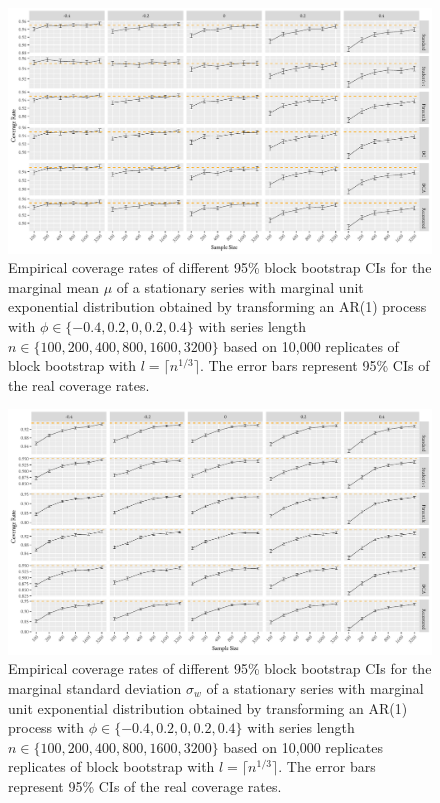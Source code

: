 \documentclass[12pt]{article}
\newcommand{\eds}[1]{\textcolor{blue}{(EDS: #1)}}
\newcommand{\mc}[1]{\textcolor{green}{(MC: #1)}}
\begin{document}
\begin{figure}[tbp]
  \centering
  \includegraphics[width=\textwidth]{figures/plot_exp_mu_1}
  \caption{Empirical coverage rates of different 95\% block bootstrap CIs for
    the marginal mean $\mu$ of a stationary series with marginal unit exponential
    distribution obtained by transforming an AR(1) process with
    $\phi \in \{-0.4, 0.2, 0, 0.2, 0.4\}$ with series length
    $n \in \{100, 200, 400, 800, 1600, 3200\}$ based on 10,000 replicates of
    block bootstrap with $l = \lceil n^{1/3} \rceil$. 
    The error bars represent 95\% CIs of the real coverage rates.}
  \label{fig:exp_mu1}
\end{figure}


\begin{figure}[tbp]
  \centering
  \includegraphics[width=\textwidth]{figures/plot_exp_sigma_1}
  \caption{Empirical coverage rates of different 95\% block bootstrap CIs for
    the marginal standard deviation $\sigma_w$ %
    of a stationary series with 
    marginal unit exponential distribution obtained by transforming an AR(1) process
    with $\phi \in \{-0.4, 0.2, 0, 0.2, 0.4\}$ with series length 
    $n \in \{100, 200, 400, 800, 1600, 3200\}$ based on 10,000 replicates 
    replicates of
    block bootstrap with $l = \lceil n^{1/3} \rceil$. 
    The error bars represent 95\% CIs of the real coverage rates.}
  \label{fig:exp_sigma1}
\end{figure}
\end{document}
